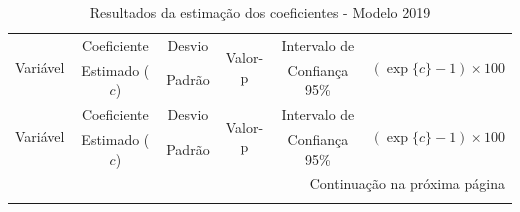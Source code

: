 \documentclass[12pt,a4paper,header]{abnt}
\begin{document}
\begin{center}
\small
\begin{longtable}{lccccc}
\caption{Resultados da estimação dos coeficientes - Modelo 2019}
\label{tab:resultados_2019} \\
\toprule
\multirow{2}{*}{Variável} & Coeficiente & Desvio & \multirow{2}{*}{Valor-p} & Intervalo de & \multirow{2}{*}{$(\exp\{c\}-1)\times 100$} \\
& Estimado ($c$) & Padrão & & Confiança 95\% & \\
\midrule
\endfirsthead

\toprule
\multirow{2}{*}{Variável} & Coeficiente & Desvio & \multirow{2}{*}{Valor-p} & Intervalo de & \multirow{2}{*}{$(\exp\{c\}-1)\times 100$} \\
& Estimado ($c$) & Padrão & & Confiança 95\% & \\
\midrule
\endhead

\midrule
\multicolumn{6}{r}{\small Continuação na próxima página} \\
\midrule
\endfoot

\bottomrule
\endlastfoot


\end{longtable}
\end{center}
\end{document}
